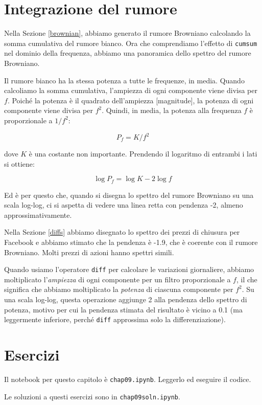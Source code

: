 \documentclass[12pt,a4paper]{book}
\begin{document}
\section{Integrazione del rumore} 

Nella Sezione \ref{brownian}, abbiamo generato il rumore Browniano calcolando la somma cumulativa del rumore bianco. Ora che comprendiamo l'effetto di {\tt cumsum} nel dominio della frequenza, abbiamo una panoramica dello spettro del rumore Browniano.

Il rumore bianco ha la stessa potenza a tutte le frequenze, in media. Quando calcoliamo la somma cumulativa, l'ampiezza di ogni componente viene divisa per $f$. Poiché la potenza è il quadrato dell'ampiezza [magnitude], la potenza di ogni componente viene divisa per $f^2$. Quindi, in media, la potenza alla frequenza $f$ è proporzionale a $1 / f^2$:

%
\[ P_f = K / f^2 \] 

%
dove $K$ è una costante non importante. Prendendo il logaritmo di entrambi i lati si ottiene:

%
\[ \log P_f = \log K - 2 \log f \] 

%
Ed è per questo che, quando si disegna lo spettro del rumore Browniano su una scala log-log, ci si aspetta di vedere una linea retta con pendenza -2, almeno approssimativamente.

Nella Sezione \ref{diffs} abbiamo disegnato lo spettro dei prezzi di chiusura per Facebook e abbiamo stimato che la pendenza è -1.9, che è coerente con il rumore Browniano. Molti prezzi di azioni hanno spettri simili.

Quando usiamo l'operatore {\tt diff} per calcolare le variazioni giornaliere, abbiamo moltiplicato l'{\em ampiezza} di ogni componente per un filtro proporzionale a $f$, il che significa che abbiamo moltiplicato la {\em potenza} di ciascuna componente per $f^2$. Su una scala log-log, questa operazione aggiunge 2 alla pendenza dello spettro di potenza, motivo per cui la pendenza stimata del risultato è vicino a 0.1 (ma leggermente inferiore, perché {\tt diff} approssima solo la differenziazione).

\section{Esercizi} 

Il notebook per questo capitolo è {\tt chap09.ipynb}. Leggerlo ed eseguire il codice.

Le soluzioni a questi esercizi sono in {\tt chap09soln.ipynb}.
\end{document}
